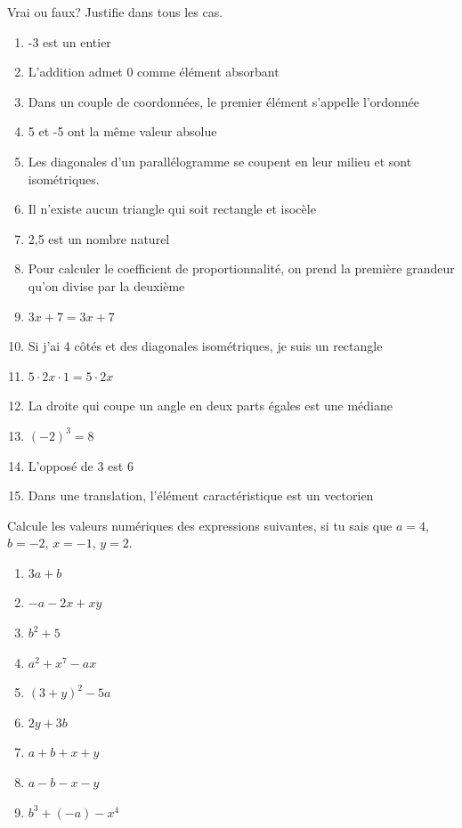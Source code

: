 \documentclass[10pt,a4paper]{article}
\begin{document}
\begin{exercise}
	Vrai ou faux? Justifie dans tous les cas. 
	\begin{enumerate}
		\item -3 est un entier
		\item L'addition admet 0 comme élément absorbant
		\item Dans un couple de coordonnées, le premier élément s'appelle l'ordonnée
		\item 5 et -5 ont la même valeur absolue
		\item Les diagonales d'un parallélogramme se coupent en leur milieu et sont isométriques.
		\item Il n'existe aucun triangle qui soit rectangle et isocèle
		\item 2,5 est un nombre naturel
		\item Pour calculer le coefficient de proportionnalité, on prend la première grandeur qu'on divise par la deuxième
		\item \(3x + 7 = 3x + 7\)
		\item Si j'ai 4 côtés et des diagonales isométriques, je suis un rectangle
		\item \(5 \cdot 2x \cdot 1 = 5 \cdot 2x\)
		\item La droite qui coupe un angle en deux parts égales est une médiane
		\item \((-2)^3=8\)
		\item L'opposé de 3 est 6
		\item Dans une translation, l'élément caractéristique est un vectorien
	\end{enumerate}
\end{exercise}

\newpage
\begin{exercise}
Calcule les valeurs numériques des expressions suivantes, si tu sais que \(a=4\), \hfill \(b=-2\), \hfill  \(x=-1\), \hfill \(y=2\).
\begin{enumerate}[cols=3]
	\item \(3a + b\)
	\item \(-a - 2x + xy\)
	\item \(b^2 + 5\)
	\item \(a^2 + x^7 - ax\)
	\item \((3 + y)^2 - 5a\)
	\item \(2y + 3b\)
	\item \(a + b + x + y\)
	\item \(a - b - x - y\)
	\item \(b^3 + (-a) - x^4\)
\end{enumerate}
\end{exercise}
\end{document}
